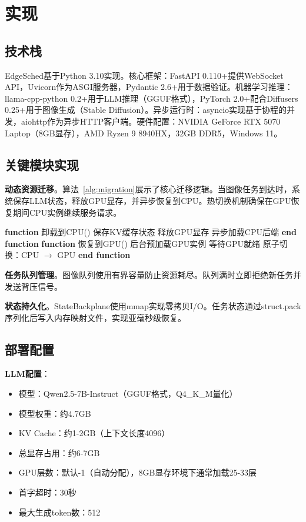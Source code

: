 \section{实现}

\subsection{技术栈}

EdgeSched基于Python 3.10实现。核心框架：FastAPI 0.110+提供WebSocket API，Uvicorn作为ASGI服务器，Pydantic 2.6+用于数据验证。机器学习推理：llama-cpp-python 0.2+用于LLM推理（GGUF格式），PyTorch 2.0+配合Diffusers 0.25+用于图像生成（Stable Diffusion）。异步运行时：asyncio实现基于协程的并发，aiohttp作为异步HTTP客户端。硬件配置：NVIDIA GeForce RTX 5070 Laptop（8GB显存），AMD Ryzen 9 8940HX，32GB DDR5，Windows 11。

\subsection{关键模块实现}

\textbf{动态资源迁移}。算法~\ref{alg:migration}展示了核心迁移逻辑。当图像任务到达时，系统保存LLM状态，释放GPU显存，并异步恢复到CPU。热切换机制确保在GPU恢复期间CPU实例继续服务请求。

\begin{algorithm}[t]
\caption{动态GPU-CPU迁移}
\label{alg:migration}
\begin{algorithmic}[1]
\STATE \textbf{function} \textsc{卸载到CPU}()
\STATE \quad 保存KV缓存状态
\STATE \quad 释放GPU显存
\STATE \quad 异步加载CPU后端
\STATE \textbf{end function}
\STATE
\STATE \textbf{function} \textsc{恢复到GPU}()
\STATE \quad 后台预加载GPU实例
\STATE \quad 等待GPU就绪
\STATE \quad 原子切换：CPU $\rightarrow$ GPU
\STATE \textbf{end function}
\end{algorithmic}
\end{algorithm}

\textbf{任务队列管理}。图像队列使用有界容量防止资源耗尽。队列满时立即拒绝新任务并发送背压信号。

\textbf{状态持久化}。StateBackplane使用mmap实现零拷贝I/O。任务状态通过struct.pack序列化后写入内存映射文件，实现亚毫秒级恢复。

\subsection{部署配置}

\textbf{LLM配置}：
\begin{itemize}
\item 模型：Qwen2.5-7B-Instruct（GGUF格式，Q4\_K\_M量化）
\item 模型权重：约4.7GB
\item KV Cache：约1-2GB（上下文长度4096）
\item 总显存占用：约6-7GB
\item GPU层数：默认-1（自动分配），8GB显存环境下通常加载25-33层
\item 首字超时：30秒
\item 最大生成token数：512
\end{itemize}

